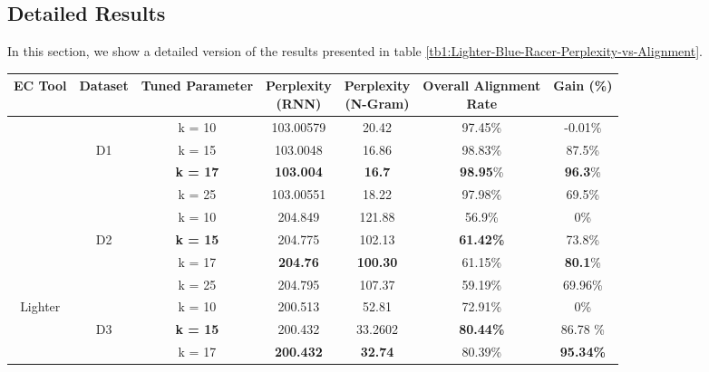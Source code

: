 \subsection{Detailed Results}

In this section, we show a detailed version of the results presented in table \ref{tb1:Lighter-Blue-Racer-Perplexity-vs-Alignment}. 
\begin{table}

\small
\begin{tabular}{ |c|c|c|c|c|c|c| } 
\hline
EC Tool & {Dataset} & Tuned Parameter & \makecell{Perplexity\\(RNN)} & \makecell{Perplexity\\(N-Gram)} & \makecell{Overall Alignment\\ Rate} & Gain (\%) \\  
 \hline
 					  &  & k = 10 & 103.00579 & 20.42 & 97.45\% & -0.01\% \\ 
 					  & D1 & k = 15 & 103.0048 & 16.86 & 98.83\% & 87.5\% \\ 
 					  &  & \textbf{k = 17} & \textbf{103.004} &  \textbf{16.7}  & \textbf{98.95}\% & \textbf{96.3}\% \\ 
 					  &  & k = 25 &  103.00551 &  18.22 & 97.98\% & 69.5\%  
\\\cline{2-7}
     					  &  & k = 10 & 204.849 & 121.88 & 56.9\% & 0\%  \\ 
						  & D2 & \textbf{k = 15} & 204.775 & 102.13 & \textbf{61.42\%} & 73.8\% \\ 
     					  &  & k = 17 &  \textbf{204.76} &  \textbf{100.30}  & 61.15\% & \textbf{80.1}\% \\
     					  &  & k = 25 & 204.795 & 107.37 & 59.19\%  & 69.96\%
 \\\cline{2-7}
     		\multirow{4}{*}{Lighter} &  & k = 10 & 200.513 & 52.81 & 72.91\% & 0\% \\ 
     					  & D3 & \textbf{k = 15} & 200.432 & 33.2602 & \textbf{80.44\%} & 86.78 \% \\ 
     					  &  & k = 17 & \textbf{200.432} & \textbf{32.74}  & 80.39\% & \textbf{95.34\%}\\ 

\end{tabular}
\end{table}
